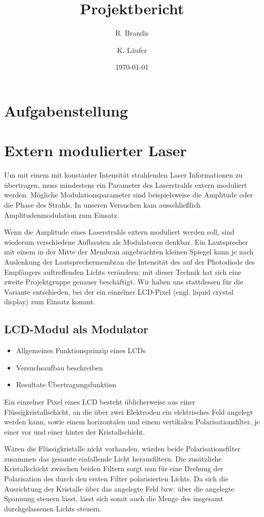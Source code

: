 \documentclass[12pt,a4paper]{article}
\title{Projektbericht}
\author{R. Brandis \and K. Läufer}
\date{\today}
\begin{document}
\maketitle
\newpage
\tableofcontents
\newpage

\section{Aufgabenstellung}

\section{Extern modulierter Laser}
Um mit einem mit konstanter Intensität strahlenden Laser Informationen zu übertragen, muss mindestens ein Parameter des Laserstrahls extern moduliert werden. Mögliche Modulationsparameter sind beispielsweise die Amplitude oder die Phase des Strahls. In unseren Versuchen kam ausschließlich Amplitudenmodulation zum Einsatz.

Wenn die Amplitude eines Laserstrahls extern moduliert werden soll, sind wiederum verschiedene Aufbauten als Modulatoren denkbar. Ein Lautsprecher mit einem in der Mitte der Membran angebrachten kleinen Spiegel kann je nach Auslenkung der Lautsprechermembran die Intensität des auf der Photodiode des Empfängers auftreffenden Lichts verändern; mit dieser Technik hat sich eine zweite Projektgruppe genauer beschäftigt. Wir haben uns stattdessen für die Variante entschieden, bei der ein einzelner LCD-Pixel (engl. liquid crystal display) zum Einsatz kommt.

\subsection{LCD-Modul als Modulator}
\begin{itemize}
\item Allgemeines Funktionsprinzip eines LCDs
\item Versuchsaufbau beschreiben
\item Resultate Übertragungsfunktion
\end{itemize}
Ein einzelner Pixel eines LCD besteht üblicherweise aus einer Flüssigkristallschicht, an die über zwei Elektroden ein elektrisches Feld angelegt werden kann, sowie einem horizontalen und einem vertikalen Polarisationsfilter, je einer vor und einer hinter der Kristallschicht.

Wären die Flüssigkristalle nicht vorhanden, würden beide Polarisationsfilter zusammen das gesamte einfallende Licht herausfiltern. Die zusätzliche Kristallschicht zwischen beiden Filtern sorgt nun für eine Drehung der Polarisation des durch den ersten Filter polarisierten Lichts. Da sich die Ausrichtung der Kristalle über das angelegte Feld bzw. über die angelegte Spannung steuern lässt, lässt sich somit auch die Menge des insgesamt durchgelassenen Lichts steuern.
\end{document}
